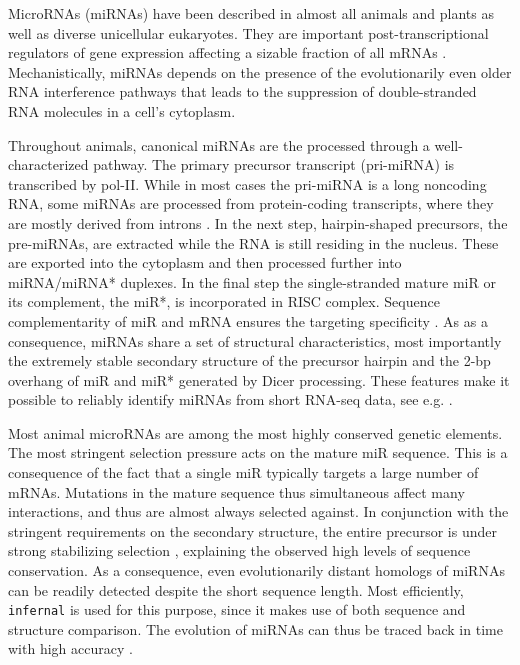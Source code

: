 \documentclass[graybox]{svmult}
\begin{document}
MicroRNAs (miRNAs) have been described in almost all animals and plants as
well as diverse unicellular eukaryotes. They are important
post-transcriptional regulators of gene expression affecting a sizable
fraction of all mRNAs \cite{Ameres:13}. Mechanistically, miRNAs depends on
the presence of the evolutionarily even older RNA interference pathways
\cite{Cerutti:06, Shabalina:08} that leads to the suppression of
double-stranded RNA molecules in a cell's cytoplasm. 

Throughout animals, canonical miRNAs are the processed through a
well-characterized pathway. The primary precursor transcript (pri-miRNA) is
transcribed by pol-II. While in most cases the pri-miRNA is a long
noncoding RNA, some miRNAs are processed from protein-coding transcripts,
where they are mostly derived from introns \cite{Lin:06}. In the next step,
hairpin-shaped precursors, the pre-miRNAs, are extracted while the RNA is
still residing in the nucleus. These are exported into the cytoplasm
\cite{Lund:04} and then processed further into miRNA/miRNA* duplexes.  In
the final step the single-stranded mature miR or its complement, the miR*,
is incorporated in RISC complex. Sequence complementarity of miR and mRNA
ensures the targeting specificity \cite{Bartel:13}. As as a consequence,
miRNAs share a set of structural characteristics, most importantly the
extremely stable secondary structure of the precursor hairpin and the 2-bp
overhang of miR and miR* generated by Dicer processing. These features make
it possible to reliably identify miRNAs from short RNA-seq data, see e.g.
\cite{Langenberger:10a, Friedlaender:12, Langenberger:13a}.

Most animal microRNAs are among the most highly conserved genetic elements.
The most stringent selection pressure acts on the mature miR sequence. This
is a consequence of the fact that a single miR typically targets a large
number of mRNAs. Mutations in the mature sequence thus simultaneous affect
many interactions, and thus are almost always selected against. In
conjunction with the stringent requirements on the secondary structure, the
entire precursor is under strong stabilizing selection \cite{Price:11},
explaining the observed high levels of sequence conservation. As a
consequence, even evolutionarily distant homologs of miRNAs can be readily
detected despite the short sequence length. Most efficiently,
\texttt{infernal} \cite{Nawrocki:13} is used for this purpose, since it
makes use of both sequence and structure comparison.  The evolution of
miRNAs can thus be traced back in time with high accuracy
\cite{Hertel:06a}. 
\end{document}
